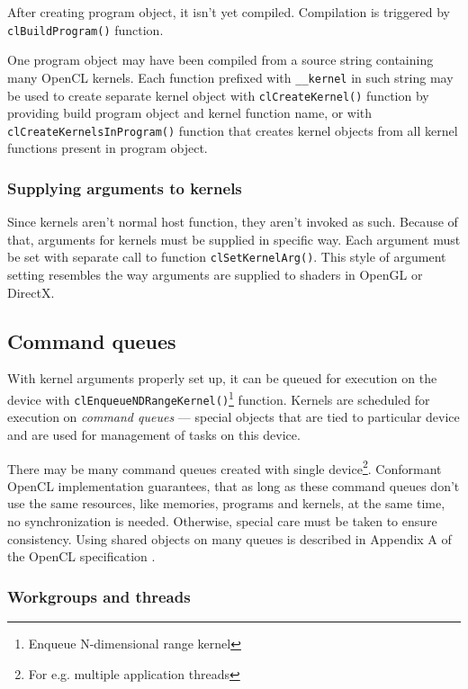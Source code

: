 After creating program object, it isn't yet compiled. Compilation is triggered
by \texttt{cl\-Build\-Program()} function.

One program object may have been compiled from a source string containing many
OpenCL kernels. Each function prefixed with \texttt{\_\_kernel} in such string
may be used to create separate kernel object with \texttt{clCreate\-Kernel()} function by
providing build program object and kernel function name, or with
\texttt{clCreateKernelsInProgram()} function that creates kernel objects from
all kernel functions present in program object.

\subsubsection{Supplying arguments to kernels}

Since kernels aren't normal host function, they aren't invoked as such. Because
of that, arguments for kernels must be supplied in specific way. Each argument
must be set with separate call to function \texttt{clSet\-Ker\-nel\-Arg()}. This style
of argument setting resembles the way arguments are supplied to shaders in OpenGL
or DirectX.

\subsection{Command queues}

With kernel arguments properly set up, it can be queued for execution on the
device with \texttt{clEnqueueNDRangeKernel()}\footnote{Enqueue N-dimensional range kernel}
function. Kernels are scheduled for execution on \emph{command queues} --- special
objects that are tied to particular device and are used for management of tasks
on this device.

There may be many command queues created with single
device\footnote{For e.g. multiple application threads}. Conformant OpenCL
implementation guarantees, that as long as these command queues don't use the
same resources, like memories, programs and kernels, at the same time, no
synchronization is needed. Otherwise, special care must be taken to ensure
consistency. Using shared objects on many queues is described in Appendix A
of the OpenCL specification \parencite{openclspec}.

\subsubsection{Workgroups and threads}
\label{subsub:clworkgroups}

